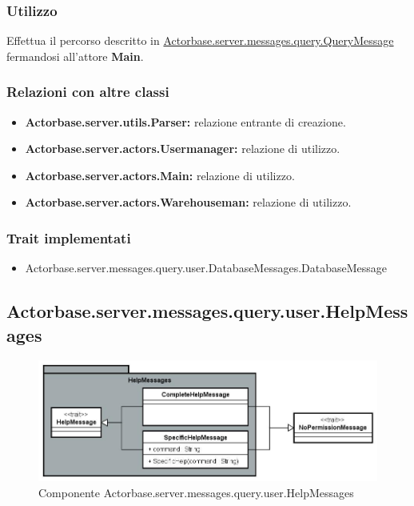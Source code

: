 \documentclass[a4paper]{article}
\begin{document}
			\subsubsection{Utilizzo}
				Effettua il percorso descritto in \hyperref[QueryMessage]{Actorbase.server.messages.query.QueryMessage} fermandosi all'attore \textbf{Main}.
				
			\subsubsection{Relazioni con altre classi}
				\begin{itemize}
					\item \textbf{Actorbase.server.utils.Parser:} relazione entrante di creazione.
					\item \textbf{Actorbase.server.actors.Usermanager:} relazione di utilizzo.
					\item \textbf{Actorbase.server.actors.Main:} relazione di utilizzo.
					\item \textbf{Actorbase.server.actors.Warehouseman:} relazione di utilizzo.
				\end{itemize}
			\subsubsection{Trait implementati}
				\begin{itemize}
					\item Actorbase.server.messages.query.user.DatabaseMessages.DatabaseMessage
				\end{itemize}
				
		\subsection{Actorbase.server.messages.query.user.HelpMessages}
		
			\begin{figure}[H]
				\centering
				\includegraphics[scale=0.70]{ST/Server/helpMessagesLevel}
				\caption{Componente Actorbase.server.messages.query.user.HelpMessages}
			\end{figure}
			
\end{document}
